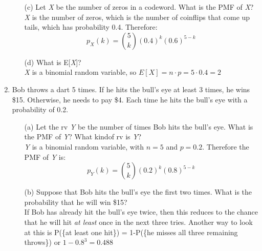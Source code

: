 \documentclass{report}
\begin{document}
\begin{enumerate}
\begin{itemize}
  \item[(c)] Let \textit{X} be the number of zeros in a codeword. What is the PMF of \textit{X}?\\ \newline
\textit{X} is the number of zeros, which is the number of coinflips that come up tails, which has probability 0.4. Therefore:
$$p_X(k) = \binom{5}{k}(0.4)^k(0.6)^{5-k}$$
\item[(d)] What is E[\textit{X}]? \\ \newline
\textit{X} is a binomial random variable, so $E[X]=n\cdot p = 5 \cdot 0.4 = 2$
\end{itemize}
\item Bob throws a dart 5 times. If he hits the bull’s eye at least 3 times, he wins \$15.
Otherwise, he needs to pay \$4. Each time he hits the bull’s eye with a probability of 0.2.
\begin{itemize}
\item[(a)] Let the rv \textit{Y} be the number of times Bob hits the bull’s eye. What is the PMF of \textit{Y}? What kindof rv is \textit{Y}?\\ \newline
\textit{Y} is a binomial random variable, with $n=5$ and $p=0.2$. Therefore the PMF of \textit{Y} is:
$$p_Y(k) = \binom{5}{k}(0.2)^k(0.8)^{5-k}$$
\item[(b)] Suppose that Bob hits the bull’s eye the first two times. What is the probability that he will win \$15?\\ \newline
If Bob has already hit the bull's eye twice, then this reduces to the chance that he will hit \textit{at least} once in the next three tries.
Another way to look at this is P(\{at least one hit\}) = 1-P(\{he misses all three remaining throws\}) or $1-0.8^3 = 0.488$

\end{itemize}
 \end{enumerate}
 
\end{document}
